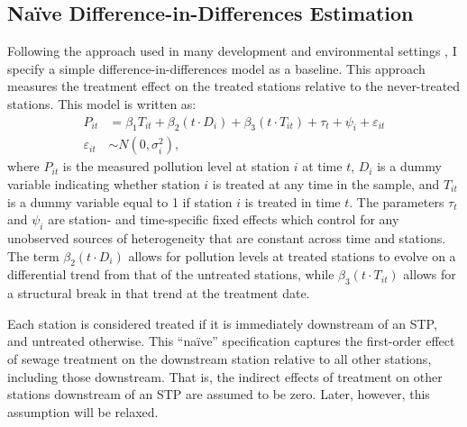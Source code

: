 \documentclass[12pt]{article}
\newcommand{\e}{\varepsilon}
\newcommand{\anum}[1]{\begin{align}#1\end{align}}
\begin{document}
\subsection{Na\"{i}ve Difference-in-Differences Estimation}

Following the approach used in many development and environmental settings \citep{greenstone2015}, I specify a simple difference-in-differences model as a baseline. This approach measures the treatment effect on the treated stations relative to the never-treated stations. This model is written as:
\anum{
	P_{it} &= \beta_1 T_{it} + \beta_2 (t\cdot D_{i}) + \beta_3 (t \cdot T_{it}) + \tau_t + \psi_i + \e_{it} \label{eq:baseline} \\
	\e_{it} &\sim N(0, \sigma^2_i), \nonumber
}
where $P_{it}$ is the measured pollution level at station $i$ at time $t$, $D_{i}$ is a dummy variable indicating whether station $i$ is treated at any time in the sample, and $T_{it}$ is a dummy variable equal to 1 if station $i$ is treated in time $t$. The parameters $\tau_t$ and $\psi_i$ are station- and time-specific fixed effects which control for any unobserved sources of heterogeneity that are constant across time and stations. The term $\beta_2 (t\cdot D_{i})$ allows for pollution levels at treated stations to evolve on a differential trend from that of the untreated stations, while $\beta_3 (t \cdot T_{it})$ allows for a structural break in that trend at the treatment date. 

Each station is considered treated if it is immediately downstream of an STP, and untreated otherwise. This ``na\"{i}ve'' specification captures the first-order effect of sewage treatment on the downstream station relative to all other stations, including those downstream. That is, the indirect effects of treatment on other stations downstream of an STP are assumed to be zero. Later, however, this assumption will be relaxed. 
\end{document}
